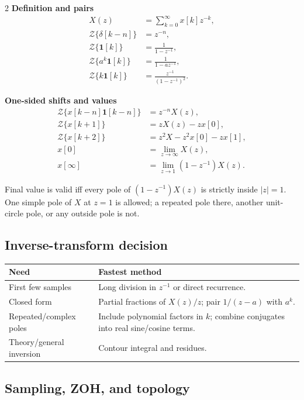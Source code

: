 \documentclass[10pt]{article}
\newcommand{\Z}{\mathcal{Z}}
\newcommand{\unitstep}{\mathbf{1}}
\begin{document}
\begin{multicols}{2}
\textbf{Definition and pairs}
\begin{align*}
X(z)&=\sum_{k=0}^{\infty}x[k]z^{-k},\\
\Z\{\delta[k-n]\}&=z^{-n},\\
\Z\{\unitstep[k]\}&=\frac{1}{1-z^{-1}},\\
\Z\{a^k\unitstep[k]\}&=\frac{1}{1-az^{-1}},\\
\Z\{k\unitstep[k]\}&=\frac{z^{-1}}{(1-z^{-1})^2}.
\end{align*}

\columnbreak
\textbf{One-sided shifts and values}
\begin{align*}
\Z\{x[k-n]\unitstep[k-n]\}&=z^{-n}X(z),\\
\Z\{x[k+1]\}&=zX(z)-zx[0],\\
\Z\{x[k+2]\}&=z^2X-z^2x[0]-zx[1],\\
x[0]&=\lim_{z\to\infty}X(z),\\
x[\infty]&=\lim_{z\to1}(1-z^{-1})X(z).
\end{align*}
\end{multicols}

Final value is valid iff every pole of $(1-z^{-1})X(z)$ is strictly inside $|z|=1$.  One simple pole of $X$ at $z=1$ is allowed; a repeated pole there, another unit-circle pole, or any outside pole is not.

\subsection{Inverse-transform decision}

\begin{center}
\begin{tabular}{p{}p{}}
\toprule
Need & Fastest method\\
\midrule
First few samples & Long division in $z^{-1}$ or direct recurrence.\\
Closed form & Partial fractions of $X(z)/z$; pair $1/(z-a)$ with $a^k$.\\
Repeated/complex poles & Include polynomial factors in $k$; combine conjugates into real sine/cosine terms.\\
Theory/general inversion & Contour integral and residues.\\
\bottomrule
\end{tabular}
\end{center}

\subsection{Sampling, ZOH, and topology}
\end{document}
